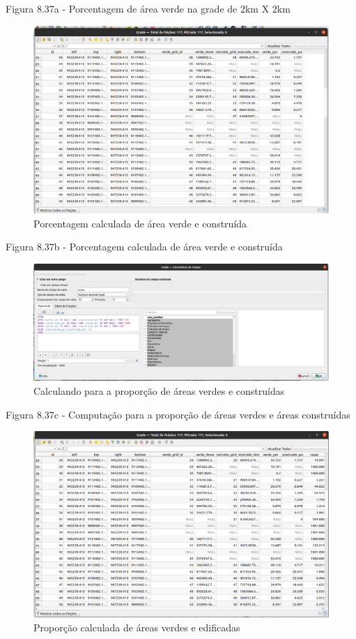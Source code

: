 \documentclass[
]{book}
\begin{document}
Figura 8.37a - Porcentagem de área verde na grade de 2km X 2km

\begin{figure}
\centering
\includegraphics{media/modulo8/fig837_b.png}
\caption{Porcentagem calculada de área verde e construída}
\end{figure}

Figura 8.37b - Porcentagem calculada de área verde e construída

\begin{figure}
\centering
\includegraphics{media/modulo8/fig837_c.png}
\caption{Calculando para a proporção de áreas verdes e construídas}
\end{figure}

Figura 8.37c - Computação para a proporção de áreas verdes e áreas construídas

\begin{figure}
\centering
\includegraphics{media/modulo8/fig837_d.png}
\caption{Proporção calculada de áreas verdes e edificadas}
\end{figure}
\end{document}
